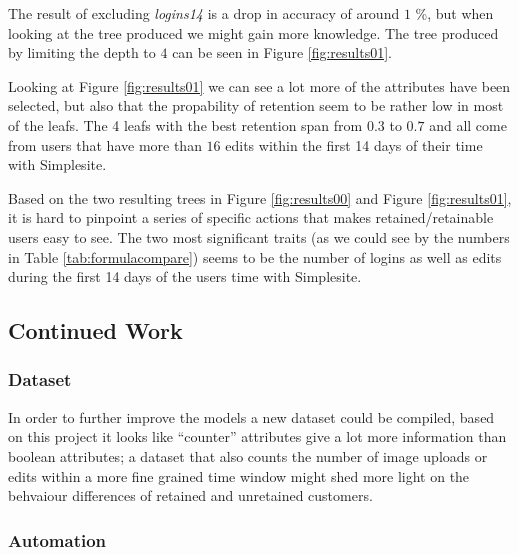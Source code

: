 The result of excluding \textit{logins14} is a drop in accuracy of around $1$
\%, but when looking at the tree produced we might gain more knowledge. The tree
produced by limiting the depth to $4$ can be seen in Figure \ref{fig:results01}.

\begin{landscape}
\end{landscape}

Looking at Figure \ref{fig:results01} we can see a lot more of the attributes
have been selected, but also that the propability of retention seem to be rather
low in most of the leafs. The 4 leafs with the best retention span from $0.3$ to
$0.7$ and all come from users that have more than $16$ edits within the first 14
days of their time with Simplesite.

Based on the two resulting trees in Figure \ref{fig:results00} and Figure
\ref{fig:results01}, it is hard to pinpoint a series of specific actions that
makes retained/retainable users easy to see. The two most significant traits (as
we could see by the numbers in Table \ref{tab:formulacompare}) seems to be the
number of logins as well as edits during the first 14 days of the users time
with Simplesite.

\subsection{Continued Work}
\label{sec:future}


\subsubsection{Dataset}

In order to further improve the models a new dataset could be compiled, based on
this project it looks like ``counter'' attributes give a lot more information
than boolean attributes; a dataset that also counts the number of image uploads
or edits within a more fine grained time window might shed more light on the
behvaiour differences of retained and unretained customers.


\subsubsection{Automation}

